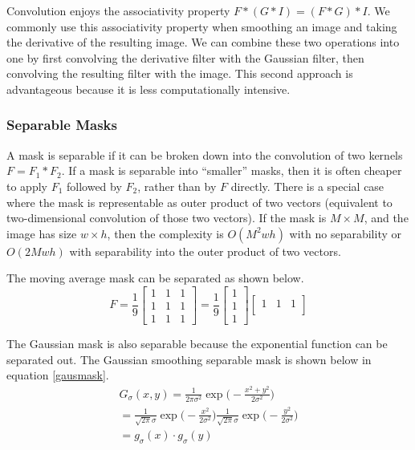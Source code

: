 \documentclass[twoside]{article}
\begin{document}
Convolution enjoys the associativity property $F*(G*I) = (F*G)*I$. We commonly use this associativity property when smoothing an image and taking the derivative of the resulting image.  We can combine these two operations into one by first convolving the derivative filter with the Gaussian filter, then convolving the resulting filter with the image.  This second approach is advantageous because it is less computationally intensive.

\subsubsection{Separable Masks}
A mask is separable if it can be broken down into the convolution of two kernels $F = F_1 * F_2$. If a mask is separable into ``smaller'' masks, then it is often cheaper to apply $F_1$ followed by $F_2$, rather than by $F$ directly. There is a special case where the mask is representable as outer product of two vectors (equivalent to two-dimensional convolution of those two vectors). If the mask is $M\times M$, and the image has size $w\times h$, then the complexity is $O(M^2wh)$ with no separability or $O(2Mwh)$ with separability into the outer product of two vectors.

The moving average mask can be separated as shown below.
\[
F = \frac{1}{9}
\begin{bmatrix}
1 & 1 & 1\\
1 & 1 & 1\\
1 & 1 & 1
\end{bmatrix} = \frac{1}{9}
\begin{bmatrix}
1 \\
1 \\
1
\end{bmatrix}
\begin{bmatrix}
1 & 1 & 1\\
\end{bmatrix}
\]

The Gaussian mask is also separable because the exponential function can be separated out. The Gaussian smoothing separable mask is shown below in equation \ref{gausmask}.
\begin{equation}
\label{gausmask}
  \begin{aligned}
  	G_\sigma(x,y) = \frac{1}{2\pi\sigma^2} \exp \bigg(-\frac{x^2 + y^2}{2\sigma^2} \bigg)\\
    = \frac{1}{\sqrt{2\pi}\sigma}\exp \bigg(-\frac{x^2}{2\sigma^2}\bigg)\frac{1}{\sqrt{2\pi}\sigma} \exp \bigg(-\frac{y^2}{2\sigma^2}\bigg) \\
    = g_\sigma(x) \cdot g_\sigma(y)
  \end{aligned}
\end{equation}
\end{document}

